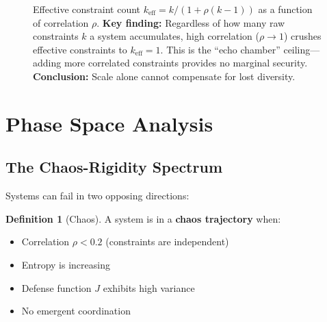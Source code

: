 \documentclass[11pt,a4paper]{article}
\theoremstyle{definition}
\newtheorem{definition}{Definition}[section]
\theoremstyle{remark}
\newcommand{\keff}{k_{\text{eff}}}
\begin{document}
\begin{figure}[H]
\caption{Effective constraint count $\keff = k/(1 + \rho(k-1))$ as a function of correlation $\rho$. \textbf{Key finding:} Regardless of how many raw constraints $k$ a system accumulates, high correlation ($\rho \to 1$) crushes effective constraints to $\keff = 1$. This is the ``echo chamber'' ceiling---adding more correlated constraints provides no marginal security. \textbf{Conclusion:} Scale alone cannot compensate for lost diversity.}
\label{fig:keff-curves}
\end{figure}

\section{Phase Space Analysis}

\subsection{The Chaos-Rigidity Spectrum}

Systems can fail in two opposing directions:

\begin{definition}[Chaos]
A system is in a \textbf{chaos trajectory} when:
\begin{itemize}[noitemsep]
    \item Correlation $\rho < 0.2$ (constraints are independent)
    \item Entropy is increasing
    \item Defense function $J$ exhibits high variance
    \item No emergent coordination
\end{itemize}
\end{definition}
\end{document}
